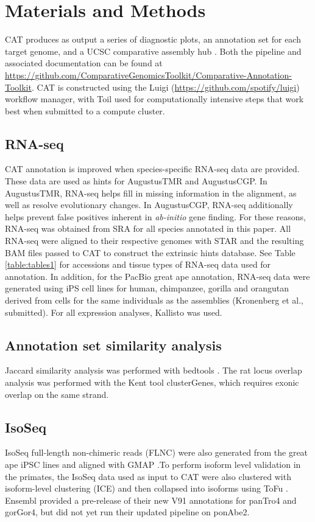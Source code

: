 \documentclass[fleqn,10pt]{wlscirep}
\begin{document}
\section*{Materials and Methods}
CAT produces as output a series of diagnostic plots, an annotation set for each target genome, and a UCSC comparative assembly hub \cite{nguyen2014comparative}. Both the pipeline and associated documentation can be found at \url{https://github.com/ComparativeGenomicsToolkit/Comparative-Annotation-Toolkit}. CAT is constructed using the Luigi (\url{https://github.com/spotify/luigi}) workflow manager, with Toil \cite{vivian2017toil} used for computationally intensive steps that work best when submitted to a compute cluster. 

\subsection*{RNA-seq}
CAT annotation is improved when species-specific RNA-seq data are provided. These data are used as hints for AugustusTMR and AugustusCGP. In AugustusTMR, RNA-seq helps fill in missing information in the alignment, as well as resolve evolutionary changes. In AugustusCGP, RNA-seq additionally helps prevent false positives inherent in \textit{ab-initio} gene finding. For these reasons, RNA-seq was obtained from SRA for all species annotated in this paper. All RNA-seq were aligned to their respective genomes with STAR \cite{dobin2013star} and the resulting BAM files passed to CAT to construct the extrinsic hints database. See Table \ref{table:tables1} for accessions and tissue types of RNA-seq data used for annotation. In addition, for the PacBio great ape annotation, RNA-seq data were generated using iPS cell lines for human, chimpanzee, gorilla and orangutan derived from cells for the same individuals as the assemblies (Kronenberg et al., submitted). For all expression analyses, Kallisto \cite{bray2015near} was used.

\subsection*{Annotation set similarity analysis}
Jaccard similarity analysis was performed with bedtools \cite{quinlan2010bedtools}. The rat locus overlap analysis was performed with the Kent tool clusterGenes, which requires exonic overlap on the same strand.

\subsection*{IsoSeq}
IsoSeq full-length non-chimeric reads (FLNC) were also generated from the great ape iPSC lines and aligned with GMAP \cite{wu2005gmap}.To perform isoform level validation in the primates, the IsoSeq data used as input to CAT were also clustered with isoform-level clustering (ICE) and then collapsed into isoforms using ToFu \cite{gordon2015widespread}. Ensembl provided a pre-release of their new V91 annotations for panTro4 and gorGor4, but did not yet run their updated pipeline on ponAbe2.
\end{document}
